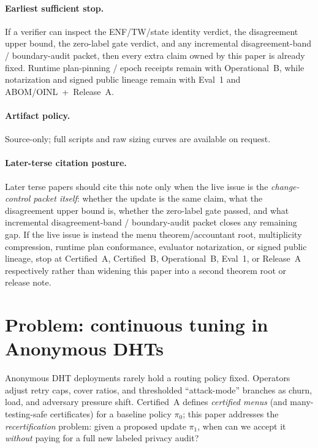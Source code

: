 \documentclass[11pt]{article}
\begin{document}
\paragraph{Earliest sufficient stop.}
If a verifier can inspect the ENF/TW/state identity verdict, the disagreement upper bound, the zero-label gate verdict, and any incremental disagreement-band / boundary-audit packet, then every extra claim owned by this paper is already fixed. Runtime plan-pinning / epoch receipts remain with Operational~B, while notarization and signed public lineage remain with Eval~1 and ABOM/OINL~+~Release~A.\cite{series:operationalB,series:eval1,series:releaseA}

\paragraph{Artifact policy.}
Source-only; full scripts and raw sizing curves are available on request.\cite{series:artifactpolicy}

\paragraph{Later-terse citation posture.}
Later terse papers should cite this note only when the live issue is the \emph{change-control packet itself}: whether the update is the same claim, what the disagreement upper bound is, whether the zero-label gate passed, and what incremental disagreement-band / boundary-audit packet closes any remaining gap.
If the live issue is instead the menu theorem/accountant root, multiplicity compression, runtime plan conformance, evaluator notarization, or signed public lineage, stop at Certified~A, Certified~B, Operational~B, Eval~1, or Release~A respectively rather than widening this paper into a second theorem root or release note.\cite{series:menus,series:sigcomp,series:operationalB,series:eval1,series:releaseA}

\section{Problem: continuous tuning in Anonymous DHTs}
Anonymous DHT deployments rarely hold a routing policy fixed.
Operators adjust retry caps, cover ratios, and thresholded ``attack-mode'' branches as churn, load, and adversary pressure shift.
Certified~A defines \emph{certified menus} (and many-testing-safe certificates) for a baseline policy $\pi_0$; this paper addresses the \emph{recertification} problem:
given a proposed update $\pi_1$, when can we accept it \emph{without} paying for a full new labeled privacy audit?
\end{document}
